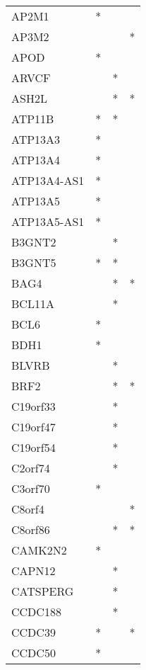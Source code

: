 \begin{longtable}{lccc}
AP2M1            &     * &    &         \\
AP3M2            &       &    &       * \\
APOD             &     * &    &         \\
ARVCF            &       &  * &         \\
ASH2L            &       &  * &       * \\
ATP11B           &     * &  * &         \\
ATP13A3          &     * &    &         \\
ATP13A4          &     * &    &         \\
ATP13A4-AS1      &     * &    &         \\
ATP13A5          &     * &    &         \\
ATP13A5-AS1      &     * &    &         \\
B3GNT2           &       &  * &         \\
B3GNT5           &     * &  * &         \\
BAG4             &       &  * &       * \\
BCL11A           &       &  * &         \\
BCL6             &     * &    &         \\
BDH1             &     * &    &         \\
BLVRB            &       &  * &         \\
BRF2             &       &  * &       * \\
C19orf33         &       &  * &         \\
C19orf47         &       &  * &         \\
C19orf54         &       &  * &         \\
C2orf74          &       &  * &         \\
C3orf70          &     * &    &         \\
C8orf4           &       &    &       * \\
C8orf86          &       &  * &       * \\
CAMK2N2          &     * &    &         \\
CAPN12           &       &  * &         \\
CATSPERG         &       &  * &         \\
CCDC188          &       &  * &         \\
CCDC39           &     * &    &       * \\
CCDC50           &     * &    &         \\

\end{longtable}
